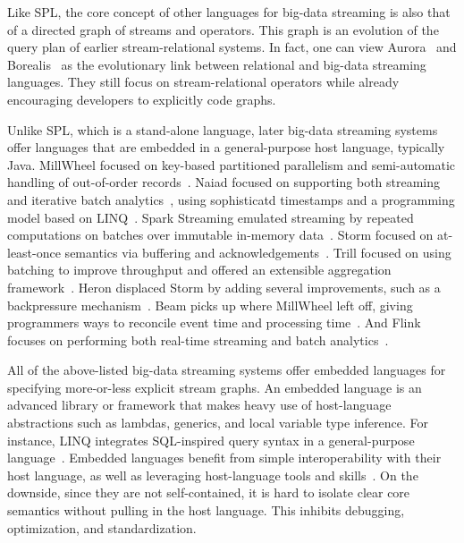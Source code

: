 Like SPL, the core concept of other languages for big-data streaming
is also that of a directed graph of streams and operators. This graph
is an evolution of the query plan of earlier stream-relational
systems. In fact, one can view \textsf{Aurora}~\cite{abadi_et_al_2003}
and \textsf{Borealis}~\cite{abadi_et_al_2005} as the evolutionary link
between relational and big-data streaming languages. They still focus
on stream-relational operators while already encouraging developers to
explicitly code graphs.

Unlike SPL, which is a stand-alone language, later big-data streaming
systems offer languages that are embedded in a general-purpose host
language, typically Java. \textsf{MillWheel} focused on key-based
partitioned parallelism and semi-automatic handling of out-of-order
records~\cite{akidau_et_al_2013}. \textsf{Naiad} focused on supporting
both streaming and iterative batch analytics~\cite{murray_et_al_2013},
using sophisticatd timestamps and a programming model based on
LINQ~\cite{meijer_beckman_bierman_2006}.  \textsf{Spark Streaming}
emulated streaming by repeated computations on batches over immutable
in-memory data~\cite{zaharia_et_al_2013}. \textsf{Storm} focused on
at-least-once semantics via buffering and
acknowledgements~\cite{toshniwal_et_al_2014}.  \textsf{Trill} focused
on using batching to improve throughput and offered an extensible
aggregation framework~\cite{chandramouli_et_al_2014}.  \textsf{Heron}
displaced Storm by adding several improvements, such as a backpressure
mechanism~\cite{kulkarni_et_al_2015}. \textsf{Beam} picks up where
MillWheel left off, giving programmers ways to reconcile event time
and processing time~\cite{akidau_et_al_2015}. And \textsf{Flink}
focuses on performing both real-time streaming and batch
analytics~\cite{carbone_et_al_2015}.

All of the above-listed big-data streaming systems offer embedded
languages for specifying more-or-less explicit stream graphs. An
embedded language is an advanced library or framework that makes heavy
use of host-language abstractions such as lambdas, generics, and local
variable type inference. For instance, LINQ integrates SQL-inspired
query syntax in a general-purpose
language~\cite{meijer_beckman_bierman_2006}.  Embedded languages
benefit from simple interoperability with their host language, as well
as leveraging host-language tools and skills~\cite{hudak_1998}. On the
downside, since they are not self-contained, it is hard to isolate
clear core semantics without pulling in the host language. This
inhibits debugging, optimization, and standardization.
